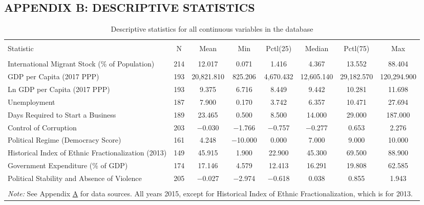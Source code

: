 \documentclass[../main.tex]{subfiles}
\begin{document}
\begin{landscape}
\section{APPENDIX B: DESCRIPTIVE STATISTICS}
\label{sec:B}
\begin{table}[H] \centering 
\caption{Descriptive statistics for all continuous variables in the database} 
\label{tab:appA} 
\begin{tabular}{@{\extracolsep{5pt}}lccccccc} 
\\[-1.8ex]\hline 
\hline \\[-1.8ex] 
Statistic & \multicolumn{1}{c}{N} & \multicolumn{1}{c}{Mean} & \multicolumn{1}{c}{Min} & \multicolumn{1}{c}{Pctl(25)} & \multicolumn{1}{c}{Median} & \multicolumn{1}{c}{Pctl(75)} & \multicolumn{1}{c}{Max} \\ 
\hline \\[-1.8ex] 
International Migrant Stock (\% of Population) & 214 & 12.017 & 0.071 & 1.416 & 4.367 & 13.552 & 88.404 \\ 
GDP per Capita (2017 PPP) & 193 & 20,821.810 & 825.206 & 4,670.432 & 12,605.140 & 29,182.570 & 120,294.900 \\ 
Ln GDP per Capita (2017 PPP) & 193 & 9.375 & 6.716 & 8.449 & 9.442 & 10.281 & 11.698 \\ 
Unemployment & 187 & 7.900 & 0.170 & 3.742 & 6.357 & 10.471 & 27.694 \\ 
Days Required to Start a Business & 189 & 23.465 & 0.500 & 8.500 & 14.000 & 29.000 & 187.000 \\ 
Control of Corruption & 203 & $-$0.030 & $-$1.766 & $-$0.757 & $-$0.277 & 0.653 & 2.276 \\ 
Political Regime (Democracy Score) & 161 & 4.248 & $-$10.000 & 0.000 & 7.000 & 9.000 & 10.000 \\ 
Historical Index of Ethnic Fractionalization (2013) & 149 & 45.915 & 1.900 & 22.900 & 45.300 & 69.500 & 88.900 \\ 
Government Expenditure (\% of GDP) & 174 & 17.146 & 4.579 & 12.413 & 16.291 & 19.808 & 62.585 \\ 
Political Stability and Absence of Violence & 205 & $-$0.027 & $-$2.974 & $-$0.618 & 0.038 & 0.855 & 1.943 \\ 
\hline \\[-1.8ex] 
\multicolumn{8}{l}{\textit{Note:} See Appendix \hyperref[sec:A]{A} for data sources. All years 2015, except for Historical Index of Ethnic Fractionalization, which is for 2013.}
\end{tabular} 
\end{table}
\end{landscape}
\end{document}
